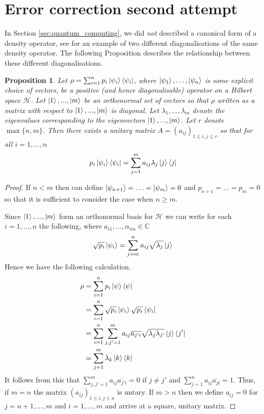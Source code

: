 \documentclass[12pt]{article}
\theoremstyle{plain}
\newtheorem{proposition}[thm]{Proposition}
\theoremstyle{definition}
\newcommand{\bb}[1]{\mathbb{#1}}
\newcommand{\call}[1]{\mathcal{#1}}
\begin{document}
	\section{Error correction second attempt}
	In Section \ref{sec:quantum_computing}, we did \emph{not} described a canonical form of a density operator, see \cite[Page 103]{quantum_computing} for an example of two different diagonalisations of the same density operator.  The following Proposition describes the relationship between these different diagonalisations.
	\begin{proposition}\label{prop:equivalent_density_operators}
		Let $\rho = \sum_{i = 1}^n p_i \ket{\psi_i}\bra{\psi_i}$, where $\ket{\psi_1},\ldots, \ket{\psi_n}$ is some explicit choice of vectors, be a positive (and hence diagonalisable) operator on a Hilbert space $\call{H}$. Let $\ket{1},...,\ket{m}$ be an orthonormal set of vectors so that $\rho$ written as a matrix with respect to $\ket{1},...,\ket{m}$ is diagonal. Let $\lambda_1,...,\lambda_m$ denote the eigenvalues corresponding to the eigenvectors $\ket{1},...,\ket{m}$. Let $r$ denote $\operatorname{max}\lbrace n, m \rbrace$. Then there exists a unitary matrix $A = (a_{ij})_{1 \leq i,j \leq r}$ so that for all $i = 1,...,n$
		\begin{equation}
			p_i\ket{\psi_i}\bra{\psi_i} = \sum_{j = 1}^m a_{ij} \lambda_j\ket{j}\bra{j}
		\end{equation}
	\end{proposition}
	\begin{proof}
		If $n < m$ then can define $\ket{\psi_{n+1}} = \hdots = \ket{\psi_{m}} = 0$ and $p_{n+1} = \hdots = p_{m} = 0$ so that it is sufficient to consider the case when $n \geq m$.
		
		Since $\ket{1},...,\ket{m}$ form an orthonormal basis for $\call{H}$ we can write for each $i = 1,...,n$ the following, where $a_{i1},...,\alpha_{im} \in \bb{C}$
		\begin{equation}\label{eq:possibly_opaque}
			\sqrt{p_i}\ket{\psi_i} = \sum_{j = m}^n a_{ij} \sqrt{\lambda_j}\ket{j}
		\end{equation}
		Hence we have the following calculation.
		\begin{align}
			\rho &= \sum_{i = 1}^n p_i \ket{\psi} \bra{\psi}\\
			&= \sum_{i = 1}^n \sqrt{p_i}\ket{\psi_i}\sqrt{p_i}\bra{\psi_i}\\
			&= \sum_{i = 1}^n\sum_{j,j'=1}^m a_{ij}\overline{a_{j'i}}\sqrt{\lambda_j \lambda_{j'}} \ket{j} \bra{j'}\\
			&= \sum_{j = 1}^m \lambda_k \ket{k}\bra{k}
		\end{align}
		It follows from this that $\sum_{j,j' = 1}^m a_{ij}\overline{a_{j'i}} = 0$ if $j \neq j'$ and $\sum_{j = 1}^n a_{ij}\overline{a_{ji}} = 1$. Thus, if $m = n$ the matrix $(a_{ij})_{1 \leq i,j \leq n}$ is untary. If $m > n$ then we define $a_{ij} = 0$ for $j = n+1,...,m$ and $i = 1,...,m$ and arrive at a square, unitary matrix.
	\end{proof}
\end{document}
